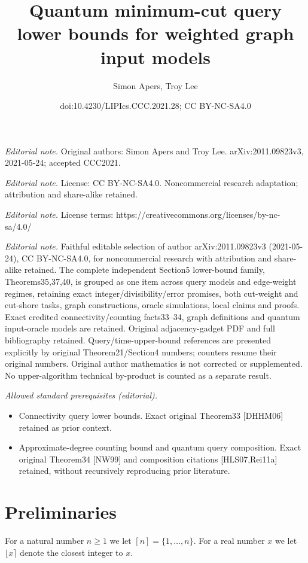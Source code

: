 \documentclass[10pt,a4paper]{article}
\title{Quantum minimum-cut query lower bounds for weighted graph input models}
\author{Simon Apers, Troy Lee}
\date{doi:10.4230/LIPIcs.CCC.2021.28; CC BY-NC-SA4.0}
\newcommand{\1}{\mathbf{1}}
\theoremstyle{definition}
\begin{document}
\maketitle
\noindent\textit{Editorial note.} Original authors: Simon Apers and Troy Lee. arXiv:2011.09823v3, 2021-05-24; accepted CCC2021.\par\medskip
\noindent\textit{Editorial note.} License: CC BY-NC-SA4.0. Noncommercial research adaptation; attribution and share-alike retained.\par\medskip
\noindent\textit{Editorial note.} License terms: https://creativecommons.org/licenses/by-nc-sa/4.0/\par\medskip
\noindent\textit{Editorial note.} Faithful editable selection of author arXiv:2011.09823v3 (2021-05-24), CC BY-NC-SA4.0, for noncommercial research with attribution and share-alike retained. The complete independent Section5 lower-bound family, Theorems35,37,40, is grouped as one item across query models and edge-weight regimes, retaining exact integer/divisibility/error promises, both cut-weight and cut-shore tasks, graph constructions, oracle simulations, local claims and proofs. Exact credited connectivity/counting facts33--34, graph definitions and quantum input-oracle models are retained. Original adjacency-gadget PDF and full bibliography retained. Query/time-upper-bound references are presented explicitly by original Theorem21/Section4 numbers; counters resume their original numbers. Original author mathematics is not corrected or supplemented. No upper-algorithm technical by-product is counted as a separate result.\par\medskip
\noindent\textit{Allowed standard prerequisites (editorial).}\begin{itemize}
\item Connectivity query lower bounds. Exact original Theorem33 [DHHM06] retained as prior context.
\item Approximate-degree counting bound and quantum query composition. Exact original Theorem34 [NW99] and composition citations [HLS07,Rei11a] retained, without recursively reproducing prior literature.
\end{itemize}\medskip
\setcounter{section}{1}
\section{Preliminaries}
For a natural number $n \ge 1$ we let $[n] = \{1, \ldots, n\}$.  For a real number $x$ we let $\lfloor x \rceil$ denote the closest integer to $x$.
\end{document}
